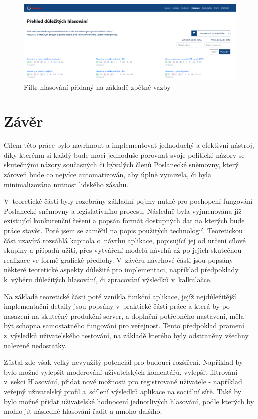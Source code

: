 \begin{figure}
    \centering
    \includegraphics[width=1\textwidth]{obrazky-figures/aplikace-filter.png}
    \caption{Filtr hlasování přidaný na základě zpětné vazby}
    \label{fig:aplikace-filter}
\end{figure}

\chapter{Závěr}
\label{chap:zaver}

Cílem této práce bylo navrhnout a implementovat jednoduchý a efektivní nástroj, díky kterému si každý bude moci jednoduše porovnat svoje politické názory se skutečnými názory současných či bývalých členů Poslanecké sněmovny, který zároveň bude co nejvíce automatizován, aby úplně vymizela, či byla minimalizována nutnost lidského zásahu.
\par V~teoretické části byly rozebrány základní pojmy nutné pro pochopení fungování Poslanecké sněmovny a legislativního procesu. Následně byla vyjmenována již existující konkurenční řešení a popsán formát dostupných dat na kterých bude práce stavět. Poté jsem se zaměřil na popis použitých technologií. Teoretickou část uzavírá rozsáhlá kapitola o~návrhu aplikace, popisující jej od určení cílové skupiny a případů užití, přes vytváření modelů návrhů až po jejich skutečnou realizace ve formě grafické předlohy. V~závěru návrhové části jsou popsány některé teoretické aspekty důležité pro implementaci, například předpoklady k~výběru důležitých hlasování, či zpracování výsledků v~kalkulačce.
\par Na základě teoretické části poté vznikla funkční aplikace, jejíž nejdůležitější implementační detaily jsou popsány v~praktické části práce a která by po nasazení na skutečný produkční server, a doplnění potřebného nastavení, měla být schopna samostatného fungování pro veřejnost. Tento předpoklad pramení z~výsledků uživatelského testování, na základě kterého byly odstraněny všechny nalezené nedostatky. 
\par Zůstal zde však velký nevyužitý potenciál pro budoucí rozšíření. Například by bylo možné vylepšit moderování uživatelských komentářů, vylepšit filtrování v~sekci Hlasování, přidat nové možnosti pro registrované uživatele - například veřejný uživatelský profil a~sdílení výsledků aplikace na sociální sítě. Také by bylo možné přidat uživatelské hodnocení jednotlivých hlasování, podle kterých by mohlo jít následně hlasování řadit a mnoho dalšího. 
